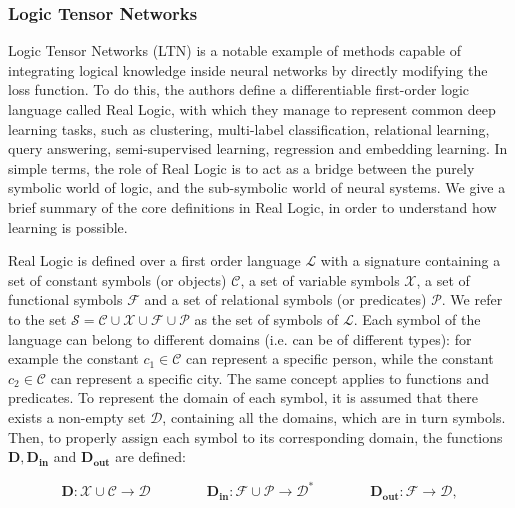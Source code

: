 \subsubsection{Logic Tensor Networks}
Logic Tensor Networks (LTN) \cite{serafini2016logic} is a notable example of methods capable of integrating logical knowledge inside neural networks by directly modifying the loss function. To do this, the authors define a differentiable first-order logic language called Real Logic, with which they manage to represent common deep learning tasks, such as clustering, multi-label classification, relational learning, query answering, semi-supervised learning, regression and embedding learning. 
In simple terms, the role of Real Logic is to act as a bridge between the purely symbolic world of logic, and the sub-symbolic world of neural systems. We give a brief summary of the core definitions in Real Logic, in order to understand how learning is possible.

Real Logic is defined over a first order language $\mathcal{L}$ with a signature containing a set of constant symbols (or objects) $\mathcal{C}$, a set of variable symbols $\mathcal{X}$, a set of functional symbols $\mathcal{F}$ and a set of relational symbols (or predicates) $\mathcal{P}$. We refer to the set $\mathcal{S} = \mathcal{C} \cup \mathcal{X} \cup \mathcal{F} \cup  \mathcal{P}$ as the set of symbols of $\mathcal{L}$. Each symbol of the language can belong to different domains (i.e. can be of different types): for example the constant $c_1 \in \mathcal{C}$ can represent a specific person, while the constant $c_2 \in \mathcal{C}$ can represent a specific city. The same concept applies to functions and predicates. To represent the domain of each symbol, it is assumed that there exists a non-empty set $\mathcal{D}$, containing all the domains, which are in turn symbols. Then, to properly assign each symbol to its corresponding domain, the functions $\mathbf{D}, \mathbf{D_{in}}$ and $\mathbf{D_{out}}$ are defined:

\begin{equation*}
\mathbf{D}: \mathcal{X} \cup \mathcal{C} \rightarrow\mathcal{D}
\qquad \qquad
\mathbf{D_{in}}: \mathcal{F} \cup \mathcal{P} \rightarrow\mathcal{D^*}
\qquad \qquad 
\mathbf{D_{out}}: \mathcal{F} \rightarrow\mathcal{D},
\end{equation*}

